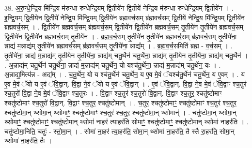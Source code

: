 \documentclass[17pt]{extarticle}
\begin{document}
38. अ॒रु॒न्धे॒न्द्रि॒य मि॑न्द्रि॒य म॑रुन्धा रुन्धेन्द्रि॒यम् द्वि॒तीये॑न द्वि॒तीये॑ नेन्द्रि॒य म॑रुन्धा रुन्धेन्द्रि॒यम् द्वि॒तीये॑न । . इ॒न्द्रि॒यम् द्वि॒तीये॑न द्वि॒तीये॑ नेन्द्रि॒य मि॑न्द्रि॒यम् द्वि॒तीये॑न ब्रह्मवर्च॒सम् ब्र॑ह्मवर्च॒सम् द्वि॒तीये॑
नेन्द्रि॒य मि॑न्द्रि॒यम् द्वि॒तीये॑न ब्रह्मवर्च॒सम् । . द्वि॒तीये॑न ब्रह्मवर्च॒सम् ब्र॑ह्मवर्च॒सम् द्वि॒तीये॑न द्वि॒तीये॑न ब्रह्मवर्च॒सम् तृ॒तीये॑न तृ॒तीये॑न ब्रह्मवर्च॒सम् द्वि॒तीये॑न द्वि॒तीये॑न ब्रह्मवर्च॒सम् तृ॒तीये॑न । . ब्र॒ह्म॒व॒र्च॒सम् तृ॒तीये॑न तृ॒तीये॑न ब्रह्मवर्च॒सम् ब्र॑ह्मवर्च॒सम् तृ॒तीये॑ना॒ न्नाद्य॑ म॒न्नाद्य॑म् तृ॒तीये॑न ब्रह्मवर्च॒सम् ब्र॑ह्मवर्च॒सम् तृ॒तीये॑ना॒ न्नाद्य᳚म् । . ब्र॒ह्म॒व॒र्च॒समिति॑ ब्रह्म - व॒र्च॒सम् । . तृ॒तीये॑ना॒ न्नाद्य॑ म॒न्नाद्य॑म् तृ॒तीये॑न तृ॒तीये॑ना॒ न्नाद्य॑म् चतु॒र्थेन॑ चतु॒र्थेना॒ न्नाद्य॑म् तृ॒तीये॑न तृ॒तीये॑ना॒ न्नाद्य॑म् चतु॒र्थेन॑ । . अ॒न्नाद्य॑म् चतु॒र्थेन॑ चतु॒र्थेना॒ न्नाद्य॑ म॒न्नाद्य॑म् चतु॒र्थेन॒ यो यश्च॑तु॒र्थेना॒ न्नाद्य॑ म॒न्नाद्य॑म् चतु॒र्थेन॒ यः । . अ॒न्नाद्य॒मित्य॑न्न - अद्य᳚म् । . च॒तु॒र्थेन॒ यो य श्च॑तु॒र्थेन॑ चतु॒र्थेन॒ य ए॒व मे॒वं ॅयश्च॑तु॒र्थेन॑ चतु॒र्थेन॒ य ए॒वम् । . य ए॒व मे॒वं ॅयो य ए॒वं ॅवि॒द्वान्. वि॒द्वा ने॒वं ॅयो य ए॒वं ॅवि॒द्वान् । . ए॒वं ॅवि॒द्वान्. वि॒द्वा ने॒व मे॒वं ॅवि॒द्वाꣳ श्च॒तुर॑ श्च॒तुरो॑ वि॒द्वा ने॒व मे॒वं ॅवि॒द्वाꣳ श्च॒तुरः॑ । . वि॒द्वाꣳ श्च॒तुर॑ श्च॒तुरो॑ वि॒द्वान्. वि॒द्वाꣳ श्च॒तुर॒ श्चतु॑ष्टोमाꣳ॒॒ श्चतु॑ष्टोमाꣳ श्च॒तुरो॑ वि॒द्वान्. वि॒द्वाꣳ श्च॒तुर॒ श्चतु॑ष्टोमान् । . च॒तुर॒ श्चतु॑ष्टोमाꣳ॒॒ श्चतु॑ष्टोमाꣳ श्च॒तुर॑ श्च॒तुर॒ श्चतु॑ष्टोमा॒न् थ्सोमा॒न् थ्सोमाꣳ॒॒ श्चतु॑ष्टोमाꣳ श्च॒तुर॑ श्च॒तुर॒ श्चतु॑ष्टोमा॒न् थ्सोमान्॑ । . चतु॑ष्टोमा॒न् थ्सोमा॒न् थ्सोमाꣳ॒॒ श्चतु॑ष्टोमाꣳ॒॒ श्चतु॑ष्टोमा॒न् थ्सोमा॑ ना॒हर॑ त्या॒हर॑ति॒ सोमाꣳ॒॒ श्चतु॑ष्टोमाꣳ॒॒ श्चतु॑ष्टोमा॒न् थ्सोमा॑ ना॒हर॑ति । . चतु॑ष्टोमा॒निति॒ चतुः॑ - स्तो॒मा॒न् । . सोमा॑ ना॒हर॑ त्या॒हर॑ति॒ सोमा॒न् थ्सोमा॑ ना॒हर॑ति॒ तै स्तै रा॒हर॑ति॒ सोमा॒न् थ्सोमा॑ ना॒हर॑ति॒ तैः । \newline
\end{document}
